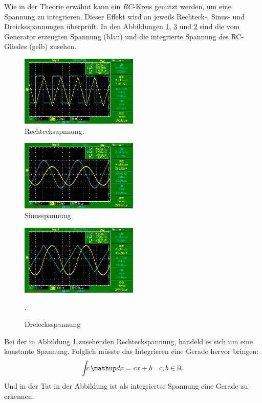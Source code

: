 Wie in der Theorie erwähnt kann ein $RC$-Kreis genutzt werden, um eine
Spannung zu integrieren.
Dieser Effekt wird an jeweils Rechteck-, Sinus- und Dreicksspannungen
überprüft.
In den Abbildungen \ref{fig:rechteck}, \ref{fig:dreieck} und \ref{fig:sinus} sind die vom
Generator erzeugten Spannung (blau) und die integrierte Spannung
des RC-Gliedes (gelb) zusehen.
\FloatBarrier
\begin{figure}
  \centering
  \includegraphics[width=0.5\textwidth]{pics/teild_rechteckspannung.png}
  \caption{Rechtecksapnnung.}
  \label{fig:rechteck}
\end{figure}
\begin{figure}
  \centering
  \includegraphics[width=0.5\textwidth]{pics/bildd_sinus.png}
  \caption{Sinusspannung}
  \label{fig:sinus}
\end{figure}
\begin{figure}
  \centering
  \includegraphics[width=0.5\textwidth]{pics/teild_dreieck.png}
  \caption{Dreiecksspannung}.
  \label{fig:dreieck}
\end{figure}
\FloatBarrier

Bei der in Abbildung \ref{fig:rechteck} zusehenden Rechteckspannung,
handeld es sich um eine konstante Spannung. Folglich müsste das Integrieren
eine Gerade hervor bringen:
\begin{equation*}
   \int\!\!\!c \dv{x}= cx+b \quad c,b\in\mathbb{R}.
\end{equation*}
Und in der Tat in der Abbildung ist als integriertse Spannung eine Gerade zu erkennen.


